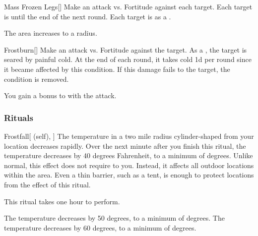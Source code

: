 \lowercase{\hypertarget{spell:Mass Frozen Legs}{}}\label{spell:Mass Frozen Legs}
\begin{freeability}[Rank 5]{\hypertarget{spell:Mass Frozen Legs}{Mass Frozen Legs}}[]
Make an attack vs. Fortitude against each target.
\hit Each target is  until the end of the next round.
\crit Each target is  as a .

\rankline
{} The area increases to a \areamed radius.
\end{freeability}
\vspace{0.25em}



\lowercase{\hypertarget{spell:Frostburn}{}}\label{spell:Frostburn}
\begin{freeability}[Rank 6]{\hypertarget{spell:Frostburn}{Frostburn}}[]
Make an attack vs. Fortitude against the target.
\hit As a , the target is seared by painful cold.
At the end of each round, it takes cold  \minus1d per round since it became affected by this condition.
If this damage fails to  the target, the condition is removed.

\rankline
{} You gain a  bonus to  with the attack.
\end{freeability}
\vspace{0.25em}



\subsubsection{Rituals}


\lowercase{\hypertarget{spell:Frostfall}{}}\label{spell:Frostfall}
\begin{attuneability}[Rank 4]{\hypertarget{spell:Frostfall}{Frostfall}}[ (self), ]
\targetrule
The temperature in a two mile radius cylinder-shaped  from your location decreases rapidly.
Over the next minute after you finish this ritual, the temperature decreases by 40 degrees Fahrenheit, to a minimum of  degrees.
Unlike normal, this effect does not require  to you.
Instead, it affects all outdoor locations within the area.
Even a thin barrier, such as a tent, is enough to protect locations from the effect of this ritual.

This ritual takes one hour to perform.

\rankline
{} The temperature decreases by 50 degrees, to a minimum of  degrees.
 The temperature decreases by 60 degrees, to a minimum of  degrees.
\end{attuneability}
\vspace{0.25em}



